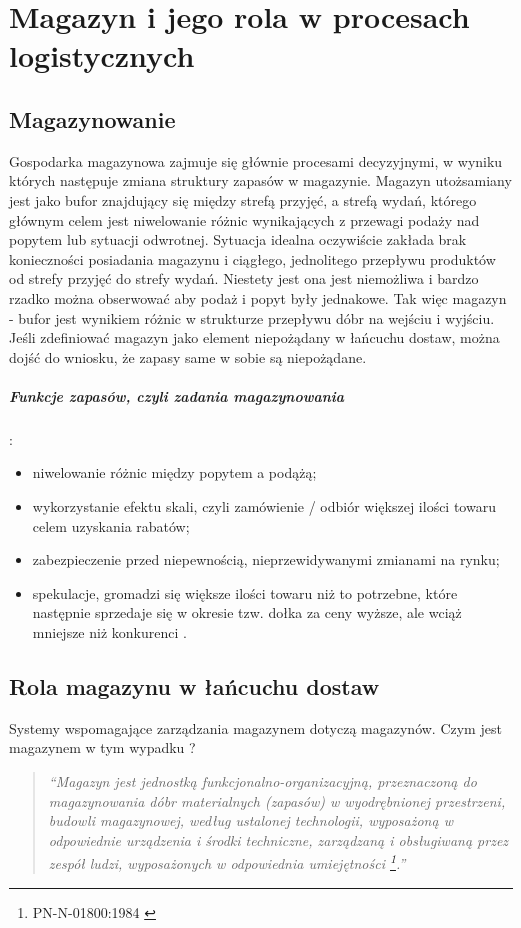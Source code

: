 \chapter{Magazyn i jego rola w procesach logistycznych}
\label{c4:c4}

\section{Magazynowanie}
	Gospodarka magazynowa zajmuje się głównie procesami decyzyjnymi, w wyniku których następuje 
	zmiana struktury zapasów w magazynie. Magazyn utożsamiany jest jako bufor znajdujący się
	między strefą przyjęć, a strefą wydań, którego głównym celem jest niwelowanie
	różnic wynikających z przewagi podaży nad popytem lub sytuacji odwrotnej. Sytuacja idealna
	oczywiście zakłada brak konieczności posiadania magazynu i ciągłego, jednolitego przepływu
	produktów od strefy przyjęć do strefy wydań. Niestety jest ona jest niemożliwa i bardzo
	rzadko można obserwować aby podaż i popyt były jednakowe. Tak więc magazyn - bufor jest
	wynikiem różnic w strukturze przepływu dóbr na wejściu i wyjściu. 
	Jeśli zdefiniować magazyn jako element niepożądany w łańcuchu dostaw, można dojść do wniosku, 
	że zapasy same w sobie są niepożądane.

	\paragraph{Funkcje zapasów, czyli zadania magazynowania}:
	\begin{itemize}
		\item niwelowanie różnic między popytem a podążą;
		\item wykorzystanie efektu skali, czyli zamówienie / odbiór większej ilości towaru celem uzyskania
		rabatów;
		\item zabezpieczenie przed niepewnością, nieprzewidywanymi zmianami na rynku;
		\item spekulacje, gromadzi się większe ilości towaru niż to potrzebne, które następnie sprzedaje się
		w okresie tzw. dołka za ceny wyższe, ale wciąż mniejsze niż konkurenci \cite{systemyLogistyczne_pfohl}.
	\end{itemize}		
	 
\section{Rola magazynu w łańcuchu dostaw}
	Systemy wspomagające zarządzania magazynem dotyczą magazynów.
	Czym jest magazynem w tym wypadku ?
	\begin{quotation}
		\textit{
			``Magazyn jest jednostką funkcjonalno-organizacyjną, przeznaczoną do magazyno\-wania
			dóbr materialnych (zapasów) w wyodrębnionej przestrzeni, budowli magazynowej, według ustalonej
			technologii, wyposażoną w odpowiednie urządzenia i środki techniczne, zarządzaną i obsługiwaną
			przez zespół ludzi, wyposażonych w odpowiednia umiejętności \footnote{PN-N-01800:1984 \cite{norm_warehouse_defintion}}.''
		}
	\end{quotation}
	
